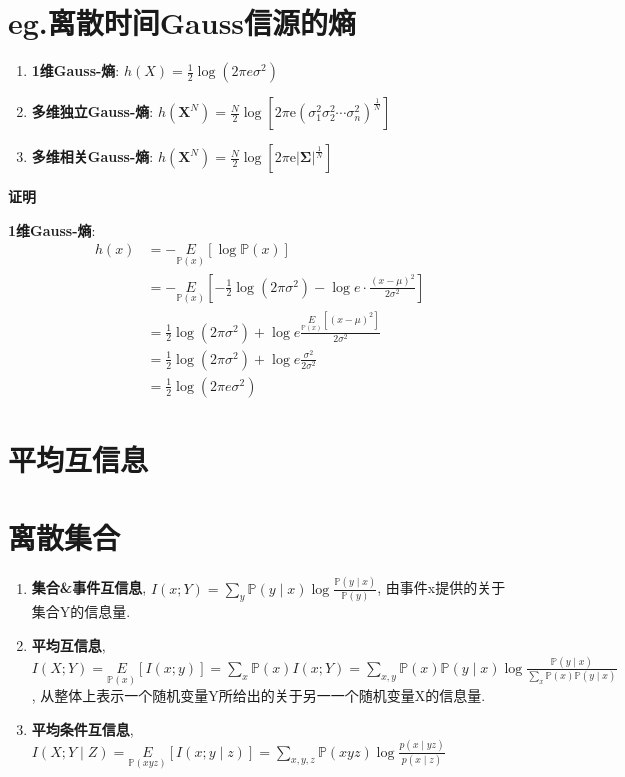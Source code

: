 \documentclass{article}
\newcommand{\env}[2]{\begin{#1}#2\end{#1}}
\newcommand{\defi}[2]{\textbf{#1}, #2}
\newcommand{\proof}[1]{\textbf{证明} #1}
\begin{document}
                \section{\textbf{eg.}离散时间Gauss信源的熵}
                    \env{enumerate}{
                        \item \textbf{1维Gauss-熵}: $h(X)=\frac{1}{2} \log \left(2 \pi e \sigma^{2}\right)$
                        \item \textbf{多维独立Gauss-熵}: $h\left(\boldsymbol{X}^{N}\right)=\frac{N}{2} \log \left[2 \pi \mathrm{e}\left(\sigma_{1}^{2} \sigma_{2}^{2} \cdots \sigma_{n}^{2}\right)^{\frac{1}{N}}\right]$
                        \item \textbf{多维相关Gauss-熵}: $h\left(\boldsymbol{X}^{N}\right)=\frac{N}{2} \log \left[2 \pi \mathrm{e} |\boldsymbol \Sigma|^{\frac{1}{N}}\right]$
                    }
    
                    \proof{\par
                        \textbf{1维Gauss-熵}: 
                        \env{align*}{
                            h(x) 
                            &= -\underset{\mathbb P(x)}{E}[\log \mathbb P(x)]\\
                            &= -\underset{\mathbb P(x)}{E}\left[-\frac{1}{2}\log(2\pi\sigma^2) - \log e · \frac{(x-\mu)^2}{2\sigma ^2}  \right]\\
                            &= \frac{1}{2}\log(2\pi\sigma^2) + \log e \frac{\underset{\mathbb P(x)}{E}\left[(x-\mu)^2\right]}{2\sigma ^2}\\
                            &= \frac{1}{2}\log(2\pi\sigma^2) + \log e \frac{\sigma ^2}{2\sigma ^2}\\
                            &= \frac{1}{2}\log(2\pi e\sigma^2)
                        }
                    }

        \section{平均互信息}
            \section{离散集合}
                \env{enumerate}{
                    \item \defi{集合&事件互信息}{$I(x ; Y)=\sum\limits_{y} \mathbb P(y \mid x) \log \frac{\mathbb P(y \mid x)}{\mathbb P(y)}$, 由事件x提供的关于集合Y的信息量.}
                    \item \defi{平均互信息}{$I(X ; Y) = \underset{\mathbb P(x)}{E}[I(x ; y)] = \sum\limits_{x} \mathbb P(x) I(x ; Y)=\sum\limits_{x, y} \mathbb P(x) \mathbb P(y \mid x) \log \frac{\mathbb P(y \mid x)}{\sum\limits_{x} \mathbb P(x) \mathbb P(y \mid x)}$, 从整体上表示一个随机变量Y所给出的关于另一一个随机变量X的信息量.}
                    \item \defi{平均条件互信息}{$I(X ; Y \mid Z)=\underset{\mathbb P(x y z)}{E}[I(x ; y \mid z)]=\sum\limits_{x, y, z} \mathbb P(x y z) \log \frac{p(x \mid y z)}{p(x \mid z)}$}
                }
                
\end{document}
